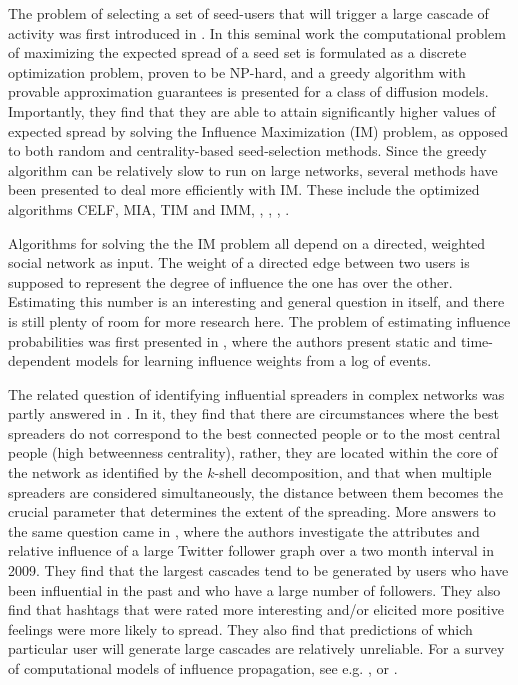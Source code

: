\documentclass[sigconf]{acmart}
\begin{document}
The problem of selecting a set of seed-users that will trigger a large cascade of activity was first introduced in \cite{kempe2003maximizing}. In this seminal work the computational problem of maximizing the expected spread of a seed set is formulated as a discrete optimization problem, proven to be NP-hard, and a greedy algorithm with provable approximation guarantees is presented for a class of diffusion models. Importantly, they find that they are able to attain significantly higher values of expected spread by solving the Influence Maximization (IM) problem, as opposed to both random and centrality-based seed-selection methods. Since the greedy algorithm can be relatively slow to run on large networks, several methods have been presented to deal more efficiently with IM. These include the optimized algorithms CELF, MIA, TIM and IMM, \cite{chen2009efficient}, \cite{chen2010scalable}, \cite{tang2014influence}, \cite{tang2015influence}. 

Algorithms for solving the the IM problem all depend on a directed, weighted social network as input. The weight of a directed edge between two users is supposed to represent the degree of influence the one has over the other. Estimating this number is an interesting and general question in itself, and there is still plenty of room for more research here. The problem of estimating influence probabilities was first presented in \cite{goyal2010learning}, where the authors present static and time-dependent models for learning influence weights from a log of events. 

The related question of identifying influential spreaders in complex networks was partly answered in \cite{kitsak2010identification}. In it, they find that there are circumstances where the best spreaders do not correspond to the best connected people or to the most central people (high betweenness centrality), rather, they are located within the core of the network as identified by the $k$-shell decomposition, and that when multiple spreaders are considered simultaneously, the distance between them becomes the crucial parameter that determines the extent of the spreading. More answers to the same question came in \cite{bakshy2011everyone}, where the authors investigate the attributes and relative influence of a large Twitter follower graph over a two month interval in 2009. They find that the largest cascades tend to be generated by users who have been influential in the past and who have a large number of followers. They also find that hashtags that were rated more interesting and/or elicited more positive feelings were more likely to spread. They also find that predictions of which particular user will generate large cascades are relatively unreliable. For a survey of computational models of influence propagation, see e.g. \cite{bonchi2011influence}, or \cite{gomez2012inferring}.
\end{document}
